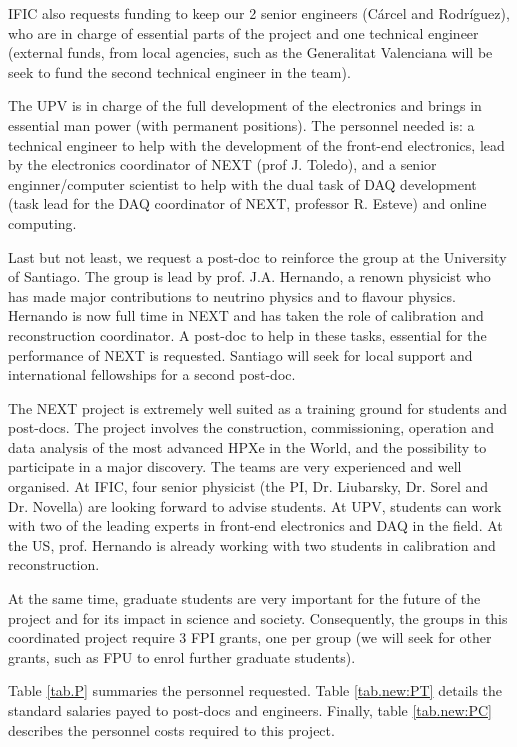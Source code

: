 IFIC also requests funding to keep our 2 senior engineers (C\'arcel and Rodr\'iguez), who are in charge of essential parts of the project and one technical engineer (external funds, from local agencies, such as the Generalitat Valenciana will be seek to fund the second technical engineer in the team). 

The UPV is in charge of the full development of the electronics and brings in essential man power (with permanent positions). The personnel needed is: a technical engineer to help with the development of the front-end electronics, lead by the electronics coordinator of NEXT (prof J. Toledo), and a senior enginner/computer scientist to help with the dual task of DAQ development (task lead for the DAQ coordinator of NEXT, professor R. Esteve) and online computing.  

Last but not least, we request a post-doc to reinforce the group at the University of Santiago. The group is lead by prof. J.A. Hernando, a renown physicist who has made major contributions to neutrino physics and to flavour physics. Hernando is now full time in NEXT and has taken the role of calibration and reconstruction coordinator. A post-doc to help in these tasks, essential for the performance of NEXT is requested. Santiago will seek for local support and international fellowships for a second post-doc.

The NEXT project is extremely well suited as a training ground for students and post-docs. The project involves the construction, commissioning, operation and data analysis of the most advanced HPXe in the World, and the possibility to participate in a major discovery. The teams are very experienced and well organised. At IFIC, four senior physicist (the PI, Dr. Liubarsky, Dr. Sorel and Dr. Novella) are looking forward to advise students. At UPV, students can work with two of the leading experts in front-end electronics and DAQ in the field. At the US, prof. Hernando is already working with two students in calibration and reconstruction.

At the same time, graduate students are very important for the future of the project and for its impact in science and society. Consequently, the groups in this coordinated project require 3 FPI grants, one per group (we will seek for other grants, such as FPU to enrol further graduate students). 

Table \ref{tab.P} summaries the personnel requested. Table \ref{tab.new:PT} details the standard salaries
payed to post-docs and engineers. Finally, table \ref{tab.new:PC} describes the personnel costs required to this project.

